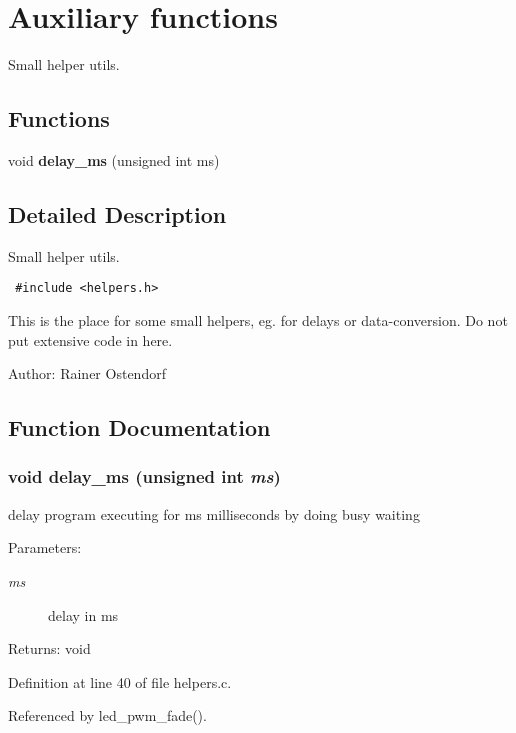 \section{Auxiliary functions}
\label{group__ro__helpers}
Small helper utils.  
\subsection*{Functions}
\begin{CompactItemize}
\item 
void {\bf delay\_\-ms} (unsigned int ms)
\end{CompactItemize}


\subsection{Detailed Description}
Small helper utils. 



\begin{Code}\begin{verbatim} #include <helpers.h> 
\end{verbatim}\end{Code}



This is the place for some small helpers, eg. for delays or data-conversion. Do not put extensive code in here.

\begin{Desc}
\item[Author:]Rainer Ostendorf \end{Desc}


\subsection{Function Documentation}
\subsubsection{\setlength{\rightskip}{0pt plus 5cm}void delay\_\-ms (unsigned int {\em ms})}\label{group__ro__helpers_gf29c4657f62375d42c6ee104b6bf4491}


delay program executing for ms milliseconds by doing busy waiting

\begin{Desc}
\item[Parameters:]
\begin{description}
\item[{\em ms}]delay in ms \end{description}
\end{Desc}
\begin{Desc}
\item[Returns:]void \end{Desc}


Definition at line 40 of file helpers.c.

Referenced by led\_\-pwm\_\-fade().